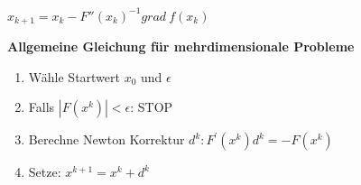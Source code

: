 \begin{center}
	$x_{k + 1} = x_k - F''(x_k)^{-1} grad\ f(x_k)$
\end{center}
\textbf{Allgemeine Gleichung für mehrdimensionale Probleme}
\begin{enumerate}
	\item Wähle Startwert $x_0$ und $\epsilon$
	\item Falls $|F(x^k)| < \epsilon$: STOP
	\item Berechne Newton Korrektur $d^k: F^{\prime}(x^k)d^k = -F(x^k)$
	\item Setze: $x^{k+1} = x^{k} + d^{k}$
\end{enumerate}